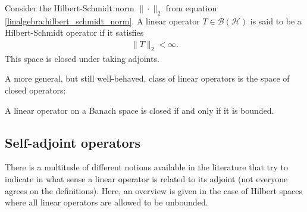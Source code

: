     \begin{example}\label{functional:hilbert_schmidt}
        Consider the Hilbert-Schmidt norm $\|\cdot\|_2$ from equation \ref{linalgebra:hilbert_schmidt_norm}. A linear operator $T\in\mathcal{B}(\mathcal{H})$ is said to be a Hilbert-Schmidt operator if it satisfies
        \begin{gather}
            \|T\|_2<\infty.
        \end{gather}
        This space is closed under taking adjoints.
    \end{example}

    A more general, but still well-behaved, class of linear operators is the space of closed operators:

    \begin{theorem}
        A linear operator on a Banach space is closed if and only if it is bounded.
    \end{theorem}

\subsection{Self-adjoint operators}

    There is a multitude of different notions available in the literature that try to indicate in what sense a linear operator is related to its adjoint (not everyone agrees on the definitions). Here, an overview is given in the case of Hilbert spaces where all linear operators are allowed to be unbounded.

